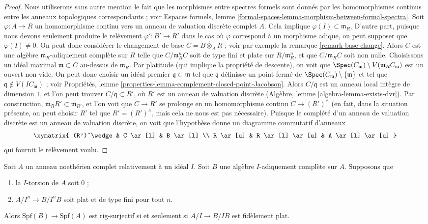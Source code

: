 \begin{proof}
Nous utiliserons sans autre mention le fait que les morphismes entre spectres formels
sont donnés par les homomorphismes continus entre les anneaux topologiques correspondants ; voir
Espaces formels, lemme \ref{formal-spaces-lemma-morphism-between-formal-spectra}.
Soit $\varphi : A \to R$ un homomorphisme continu vers un anneau de
valuation discrète complet $A$. Cela implique $\varphi(I) \subset \mathfrak m_R$.
D'autre part, puisque nous devons seulement produire le relèvement
$\varphi' : B' \to R'$ dans le cas où $\varphi$ correspond à un morphisme
adique, on peut supposer que $\varphi(I) \not = 0$. On peut donc considérer
le changement de base $C = B \widehat{\otimes}_A R$ ; voir par exemple la
remarque \ref{remark-base-change}.
Alors $C$ est une algèbre $\mathfrak m_R$-adiquement complète sur $R$
telle que $C/\mathfrak m_R^n C$ soit de type fini et plate sur
$R/\mathfrak m_R^n$, et que $C/\mathfrak m_R C$ soit non nulle.
Choisissons un idéal maximal $\mathfrak m \subset C$ au-dessus de
$\mathfrak m_R$. Par platitude (qui implique la propriété de descente), on voit que
$\Spec(C_\mathfrak m) \setminus V(\mathfrak m_R C_\mathfrak m)$
est un ouvert non vide. On peut donc choisir un idéal premier
$\mathfrak q \subset \mathfrak m$ tel que $\mathfrak q$ définisse un point fermé de
$\Spec(C_\mathfrak m) \setminus \{\mathfrak m\}$ et tel que
$\mathfrak q \not \in V(IC_\mathfrak m)$ ; voir
Propriétés, lemme \ref{properties-lemma-complement-closed-point-Jacobson}.
Alors $C/\mathfrak q$ est un anneau local intègre de dimension $1$, et l'on peut trouver
$C/\mathfrak q \subset R'$, où $R'$ est un anneau de valuation discrète
(Algèbre, lemme \ref{algebra-lemma-exists-dvr}).
Par construction, $\mathfrak m_R R' \subset \mathfrak m_{R'}$,
et l'on voit que $C \to R'$ se prolonge en un homomorphisme continu
$C \to (R')^\wedge$ (en fait, dans la situation présente, on peut choisir $R'$ tel que
$R' = (R')^\wedge$, mais cela ne nous est pas nécessaire).
Puisque le complété d'un anneau de valuation discrète est un anneau de
valuation discrète, on voit que l'hypothèse donne un diagramme commutatif
d'anneaux
$$
\xymatrix{
(R')^\wedge & C \ar[l] & B \ar[l] \\
R \ar[u] & R \ar[l] \ar[u] & A \ar[l] \ar[u]
}
$$
qui fournit le relèvement voulu.
\end{proof}

\begin{lemma}
\label{lemma-flat-rig-surjective}
Soit $A$ un anneau noethérien complet relativement à un idéal $I$.
Soit $B$ une algèbre $I$-adiquement complète sur $A$. Supposons que
\begin{enumerate}
\item la $I$-torsion de $A$ soit $0$ ;
\item $A/I^n \to B/I^nB$ soit plat et de type fini pour tout $n$.
\end{enumerate}
Alors $\text{Spf}(B) \to \text{Spf}(A)$ est rig-surjectif si et seulement
si $A/I \to B/IB$ est fidèlement plat.
\end{lemma}

